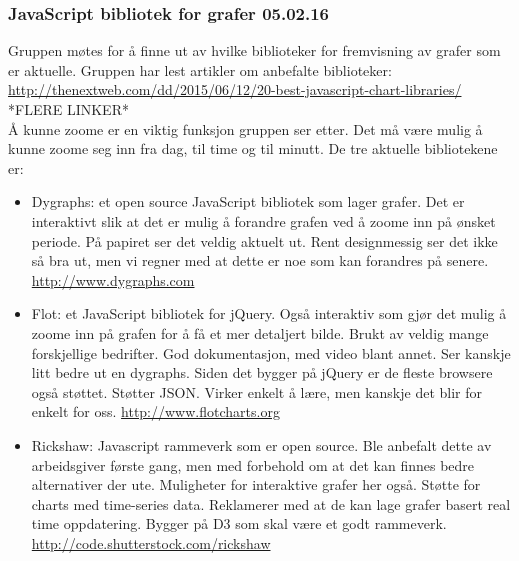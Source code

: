 \documentclass[12pt, oneside]{article}
\begin{document}
\subsubsection{JavaScript bibliotek for grafer 05.02.16}
Gruppen møtes for å finne ut av hvilke biblioteker for fremvisning av grafer som er aktuelle. Gruppen har lest artikler om anbefalte biblioteker:\\
\url{http://thenextweb.com/dd/2015/06/12/20-best-javascript-chart-libraries/}\\
*FLERE LINKER*\\
Å kunne zoome er en viktig funksjon gruppen ser etter. Det må være mulig å kunne zoome seg inn fra dag, til time og til minutt. De tre aktuelle bibliotekene er:
\begin{itemize}
	\item Dygraphs: et open source JavaScript bibliotek som lager grafer. Det er interaktivt slik at det er mulig å forandre grafen ved å zoome inn på 		ønsket periode. På papiret ser det veldig aktuelt ut. Rent designmessig ser det ikke så bra ut, men vi regner med at dette er noe som kan 		forandres på senere. \url{http://www.dygraphs.com}
	\item Flot: et JavaScript bibliotek for jQuery. Også interaktiv som gjør det mulig å zoome inn på grafen for å få et mer detaljert bilde. Brukt av 			veldig mange forskjellige bedrifter. God dokumentasjon, med video blant annet. Ser kanskje litt bedre ut en dygraphs. Siden det bygger på 		jQuery er de fleste browsere også støttet. Støtter JSON. Virker enkelt å lære, men kanskje det blir for enkelt for oss. \url{http://www.flotcharts.org}
	\item Rickshaw: Javascript rammeverk som er open source. Ble anbefalt dette av arbeidsgiver første gang, men med forbehold om at det kan 			finnes bedre alternativer der ute. Muligheter for interaktive grafer her også. Støtte for charts med time-series data. Reklamerer med at de kan 		lage grafer basert real time oppdatering. Bygger på D3 som skal være et godt rammeverk. \url{http://code.shutterstock.com/rickshaw}
\end{itemize}
\end{document}
